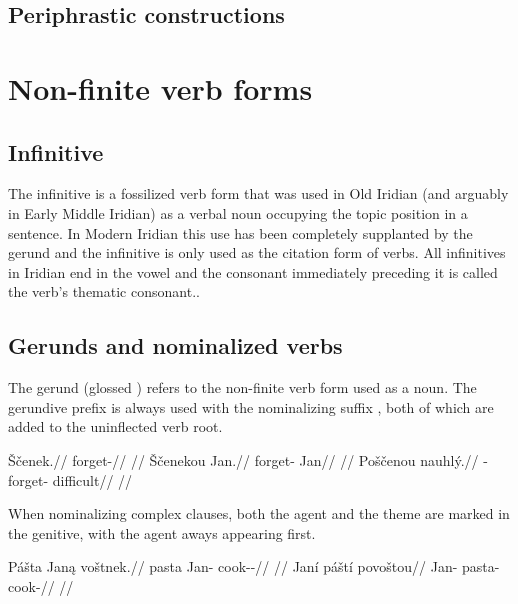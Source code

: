 \subsection{Periphrastic constructions}


\section{Non-finite verb forms}

\subsection{Infinitive}\label{sec:infinitive}

The {\sc infinitive} is a fossilized verb form that was used in Old Iridian (and arguably in Early Middle Iridian) as a verbal noun occupying the topic position in a sentence. In Modern Iridian this use has been completely supplanted by the gerund and the infinitive is only used as the citation form of verbs. All infinitives in Iridian end in the vowel  and the consonant immediately preceding it is called the verb's thematic consonant..

\subsection{Gerunds and nominalized verbs}
\par The gerund (glossed ) refers to the non-finite verb form used as a noun. The gerundive prefix  is always used with the nominalizing suffix , both of which are added to the uninflected verb root.

\pex
\a
\begingl
\gla Ščenek.//
\glb forget-//
\glft {}//
\endgl
\a
\begingl
\gla Ščenekou Jan.//
\glb forget- Jan//
\glft {}//
\endgl
\a
\begingl
\gla Poščenou nauhl\'y.//
\glb {}-forget- difficult//
\glft {}//
\endgl
\xe

When nominalizing complex clauses, both the agent and the theme are marked in the genitive, with the agent aways appearing first.

\pex
\a
\begingl
\gla Pášta Jan\k{a} voštnek.//
\glb pasta Jan-\Agt{} cook-\Pv{}-\Pf{}//
\glft {}//
\endgl
\a
\begingl
\gla Janí páští povoštou//
\glb Jan-\Gen{} pasta-\Gen{} cook-//
\glft {}//
\endgl
\xe

